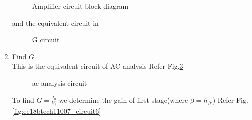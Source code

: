 \begin{enumerate}[label=\thesection.\arabic*.,ref=\thesection.\theenumi]
\begin{figure}[!ht]
\begin{center}
		\resizebox{\columnwidth}{!}{}
	\end{center}
\caption{Amplifier circuit  block diagram}
\label{fig:ee18btech11007_G_blockdiagram}
\end{figure}
and the equivalent circuit in 
 \begin{figure}[!ht]
	\begin{center}
		
		\resizebox{\columnwidth}{!}{}
	\end{center}
\caption{G circuit}
\label{fig:ee18btech11007_circuit3}
\end{figure}





\item Find $G$ 
\renewcommand{\thefigure}{\theenumi.\arabic{figure}}
\\
\solution
This is the equivalent circuit of AC analysis
Refer Fig.\ref{fig:ee18btech11007_ac_analysis_circuit}

\begin{figure}[!ht]
	\begin{center}
		
		\resizebox{\columnwidth}{!}{}
	\end{center}
\caption{ac analysis circuit}
\label{fig:ee18btech11007_ac_analysis_circuit}
\end{figure}

To find $G=\frac{I_0}{V_i}$ we determine the gain of first stage(where $\beta = h_{fe}$)
Refer Fig. \ref{fig:ee18btech11007_circuit6}

\begin{figure}[!ht]
	\begin{center}
		

\end{center}
\end{figure}
\end{enumerate}
